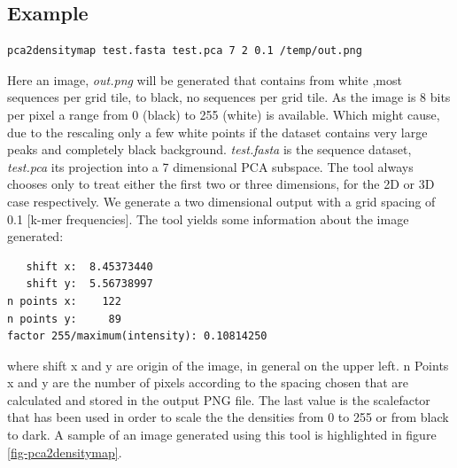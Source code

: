 \subsection{Example}
\begin{lstlisting}
pca2densitymap test.fasta test.pca 7 2 0.1 /temp/out.png
\end{lstlisting}
Here an image, \emph{out.png} will be generated that contains from
white ,most sequences per grid tile, to black, no sequences per grid
tile. As the image is 8 bits per pixel a range from 0 (black) to 255
(white) is available. Which might cause, due to the rescaling only a
few white points if the dataset contains very large peaks and
completely black background. \emph{test.fasta} is the sequence
dataset, \emph{test.pca} its projection into a 7 dimensional PCA
subspace. The tool always chooses only to treat either the first two or
three dimensions, for the 2D or 3D case respectively.
We generate a two dimensional output with a grid spacing of
0.1 [k-mer frequencies]. The tool yields some information about
the image generated:
\begin{lstlisting}
   shift x:  8.45373440
   shift y:  5.56738997
n points x:    122
n points y:     89
factor 255/maximum(intensity): 0.10814250
\end{lstlisting}
where shift x and y are origin of the image, in general on the upper
left. n Points x and y are the number of pixels according to the
spacing chosen that are calculated and stored in the output PNG
file. The last value is the scalefactor that has been used in order to
scale the the densities from 0 to 255 or from black to dark. A sample
of an image generated using this tool is highlighted in figure
\ref{fig-pca2densitymap}.
